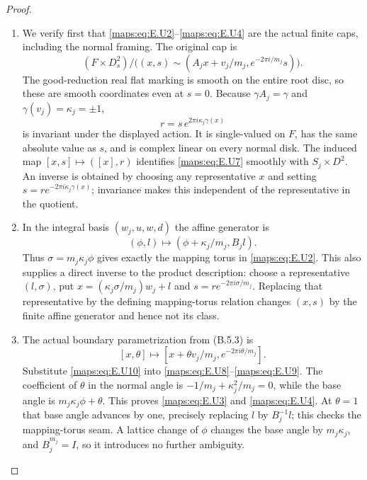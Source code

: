 \begin{proof}
\begin{enumerate}[label=\arabic*.,leftmargin=*]
\item We verify first that \eqref{maps:eq:E.U2}--\eqref{maps:eq:E.U4} are the actual finite caps,
including the normal framing.  The original cap is
\[
 (F\times D^2_s)/
 \bigl((x,s)\sim(A_jx+v_j/m_j,e^{-2\pi i/m_j}s)\bigr).
 \tag{E.U7}\label{maps:eq:E.U7}
\]
The good-reduction real flat marking is smooth on the entire
root disc, so these are smooth coordinates even at $s=0$.
Because $\gamma A_j=\gamma$ and $\gamma(v_j)=\kappa_j=\pm1$,
\[
                  r=s\,e^{2\pi i\kappa_j\gamma(x)}
 \tag{E.U8}\label{maps:eq:E.U8}
\]
is invariant under the displayed action.  It is single-valued
on $F$, has the same absolute value as $s$, and is complex
linear on every normal disk.  The induced map
$[x,s]\mapsto([x],r)$ identifies \eqref{maps:eq:E.U7} smoothly with
$S_j\times D^2$.  An inverse is obtained by choosing any
representative $x$ and setting
$s=r e^{-2\pi i\kappa_j\gamma(x)}$; invariance makes this
independent of the representative in the quotient.

\item In the integral basis $(w_j,u,w,d)$ the affine generator is
\[
                  (\phi,l)\longmapsto
                     (\phi+\kappa_j/m_j,B_jl).
 \tag{E.U9}\label{maps:eq:E.U9}
\]
Thus $\sigma=m_j\kappa_j\phi$ gives exactly the mapping torus
in \eqref{maps:eq:E.U2}.  This also supplies a direct inverse to the product
description: choose a representative $(l,\sigma)$, put
$x=(\kappa_j\sigma/m_j)w_j+l$ and
$s=r e^{-2\pi i\sigma/m_j}$.  Replacing that representative
by the defining mapping-torus relation changes $(x,s)$ by
the finite affine generator and hence not its class.

\item The actual boundary parametrization from (B.5.3) is
\[
 [x,\theta]\longmapsto
       [x+\theta v_j/m_j,e^{-2\pi i\theta/m_j}].
 \tag{E.U10}\label{maps:eq:E.U10}
\]
Substitute \eqref{maps:eq:E.U10} into \eqref{maps:eq:E.U8}--\eqref{maps:eq:E.U9}.  The coefficient of
$\theta$ in the normal angle is
$-1/m_j+\kappa_j^2/m_j=0$, while the base angle is
$m_j\kappa_j\phi+\theta$.  This proves \eqref{maps:eq:E.U3} and \eqref{maps:eq:E.U4}.
At $\theta=1$ that base angle advances by one, precisely
replacing $l$ by $B_j^{-1}l$; this checks the mapping-torus
seam.  A lattice change of $\phi$ changes the base angle by
$m_j\kappa_j$, and $B_j^{m_j}=I$, so it introduces no further
ambiguity.


\end{enumerate}
\end{proof}
